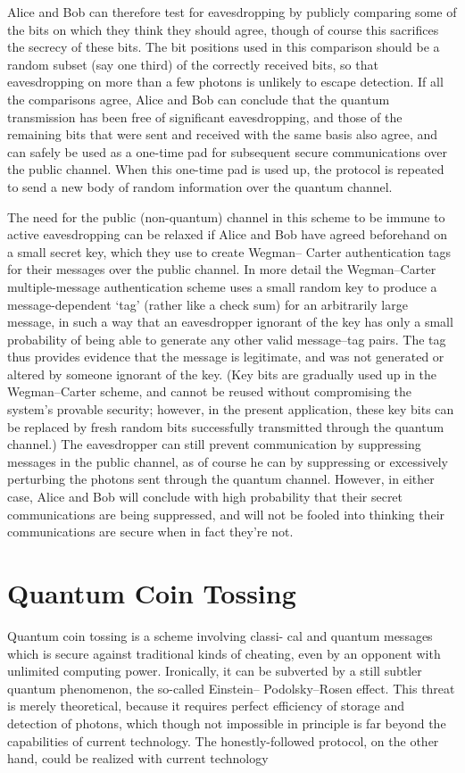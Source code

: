 Alice and Bob can therefore test for eavesdropping by
publicly comparing some of the bits on which they think they should agree, though of course this sacrifices the secrecy of these bits. The bit positions used in this comparison should be a random subset (say one third) of the correctly received bits, so that eavesdropping on more than a few photons is unlikely to escape detection. If all the comparisons agree, Alice and Bob can conclude that the quantum transmission has been free of significant eavesdropping, and those of the remaining bits that were sent and received with the same basis also agree, and can safely be used as a one-time pad for subsequent secure communications over the public channel. When this one-time pad is used up, the protocol is repeated to send a new body of random information over the quantum channel.

The need for the public (non-quantum) channel in this scheme to be immune to active eavesdropping can be relaxed if Alice and Bob have agreed beforehand on a small secret key, which they use to create Wegman– Carter authentication tags \cite{Goldreich1991} for their messages over the public channel. In more detail the Wegman–Carter multiple-message authentication scheme uses a small random key to produce a message-dependent ‘tag’ (rather like a check sum) for an arbitrarily large message, in such a way that an eavesdropper ignorant of the key has only a small probability of being able to generate any other valid message–tag pairs. The tag thus provides evidence that the message is legitimate, and was not generated or altered by someone ignorant of the key. (Key bits are gradually used up in the Wegman–Carter scheme, and cannot be reused without compromising the system’s provable security; however, in the present application, these key bits can be replaced by fresh random bits successfully transmitted through the quantum channel.) The eavesdropper can still prevent communication by suppressing messages in the public channel, as of course he can by suppressing or excessively perturbing the photons sent through the quantum channel. However, in either case, Alice and Bob will conclude with high probability that their secret communications are being suppressed, and will not be fooled into thinking their communications are secure when in fact they’re not.


\section{Quantum Coin Tossing} 
Quantum coin tossing is a scheme involving classi-
cal and quantum messages which is secure against traditional kinds of cheating, even by an opponent with unlimited computing power. Ironically, it can be subverted by a still subtler quantum phenomenon, the so-called Einstein– Podolsky–Rosen effect. This threat is merely theoretical, because it requires perfect efficiency of storage and detection of photons, which though not impossible in principle is far beyond the capabilities of current technology. The honestly-followed protocol, on the other hand, could be realized with current technology

